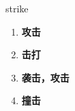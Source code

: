 
\begin{frame}
{\huge strike}
\begin{center}
\begin{enumerate}\Large
  \item \textbf{攻击}
  \item \textbf{击打}
  \item \textbf{袭击，攻击}
  \item \textbf{撞击}
\end{enumerate}
\end{center}
\end{frame}
